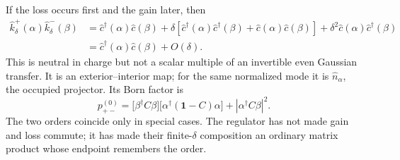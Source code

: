\documentclass[aps,prb,onecolumn,nofootinbib,superscriptaddress]{revtex4-2}
\newcommand{\I}{\mathbf{1}}
\theoremstyle{plain}
\theoremstyle{definition}
\begin{document}
If the loss occurs first and the gain later, then
\begin{align}
  \hat k_\delta^+(\alpha)\hat k_\delta^-(\beta)
  &=
  \hat c^\dagger(\alpha)\hat c(\beta)
  +\delta\!\left[
    \hat c^\dagger(\alpha)\hat c^\dagger(\beta)
    +\hat c(\alpha)\hat c(\beta)
  \right]
  +\delta^2\hat c(\alpha)\hat c^\dagger(\beta)
  \nonumber\\
  &=
  \hat c^\dagger(\alpha)\hat c(\beta)+O(\delta).
  \label{eq:anticausal-pair-regulated-expansion}
\end{align}
This is neutral in charge but not a scalar multiple of an invertible even
Gaussian transfer.  It is an exterior--interior map; for the same normalized
mode it is \(\hat n_\alpha\), the occupied projector.  Its Born factor is
\begin{equation}
  p_{+-}^{(0)}
  =
  \bigl[\beta^\dagger C\beta\bigr]
  \bigl[\alpha^\dagger(\I-C)\alpha\bigr]
  +
  \left|\alpha^\dagger C\beta\right|^2 .
  \label{eq:anticausal-pair-born}
\end{equation}
The two orders coincide only in special cases.  The regulator has not made
gain and loss commute; it has made their finite-\(\delta\) composition an
ordinary matrix product whose endpoint remembers the order.
\end{document}
